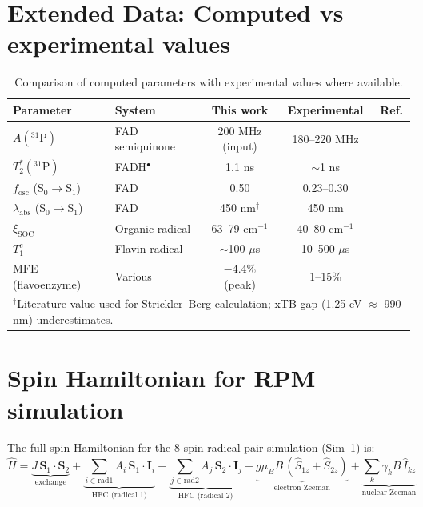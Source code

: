 \documentclass[11pt]{article}
\begin{document}
\section{Extended Data: Computed vs experimental values}

\begin{table}[htbp]
\centering
\caption{Comparison of computed parameters with experimental values where available.}
\label{tab:validation}
\small
\begin{tabular}{@{}llccc@{}}
\toprule
Parameter & System & This work & Experimental & Ref. \\
\midrule
$A(^{31}\mathrm{P})$ & FAD semiquinone & 200 MHz (input) & 180--220 MHz & \cite{Weber1998} \\
$T_2^*(^{31}\mathrm{P})$ & FADH$^\bullet$ & 1.1 ns & $\sim$1 ns & \cite{Weber1998} \\
$f_\mathrm{osc}$ (S$_0\to$S$_1$) & FAD & 0.50 & 0.23--0.30 & \cite{Islam2003} \\
$\lambda_\mathrm{abs}$ (S$_0\to$S$_1$) & FAD & 450 nm$^\dagger$ & 450 nm & \cite{Islam2003} \\
$\xi_\mathrm{SOC}$ & Organic radical & 63--79 cm$^{-1}$ & 40--80 cm$^{-1}$ & \cite{Marian2012} \\
$T_1^e$ & Flavin radical & $\sim$100 $\mu$s & 10--500 $\mu$s & \cite{Weber1998} \\
MFE (flavoenzyme) & Various & $-4.4\%$ (peak) & 1--15\% & \cite{Maeda2012} \\
\bottomrule
\multicolumn{5}{l}{\footnotesize $^\dagger$Literature value used for Strickler--Berg calculation; xTB gap (1.25 eV $\approx$ 990 nm) underestimates.}
\end{tabular}
\end{table}

\section{Spin Hamiltonian for RPM simulation}

The full spin Hamiltonian for the 8-spin radical pair simulation (Sim~1) is:
\begin{equation}
\hat{H} = \underbrace{J\,\mathbf{S}_1 \cdot \mathbf{S}_2}_{\text{exchange}} + \underbrace{\sum_{i \in \mathrm{rad1}} A_i\,\mathbf{S}_1 \cdot \mathbf{I}_i}_{\text{HFC (radical 1)}} + \underbrace{\sum_{j \in \mathrm{rad2}} A_j\,\mathbf{S}_2 \cdot \mathbf{I}_j}_{\text{HFC (radical 2)}} + \underbrace{g\mu_B B\,(\hat{S}_{1z} + \hat{S}_{2z})}_{\text{electron Zeeman}} + \underbrace{\sum_k \gamma_k B\,\hat{I}_{kz}}_{\text{nuclear Zeeman}}
\end{equation}
\end{document}

